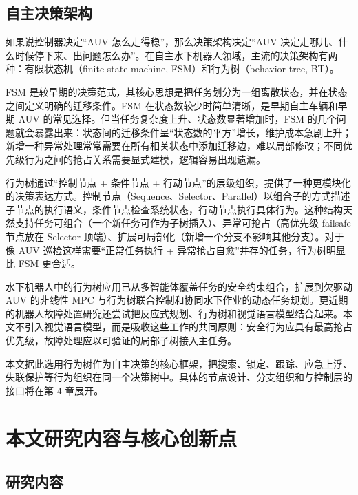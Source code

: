 \subsection{自主决策架构}\label{sec:ch01-1-3-2}

如果说控制器决定``AUV 怎么走得稳''，那么决策架构决定``AUV 决定走哪儿、什么时候停下来、出问题怎么办''。在自主水下机器人领域，主流的决策架构有两种：有限状态机（finite state machine, FSM）和行为树（behavior tree, BT）。

FSM 是较早期的决策范式，其核心思想是把任务划分为一组离散状态，并在状态之间定义明确的迁移条件。FSM 在状态数较少时简单清晰，是早期自主车辆和早期 AUV 的常见选择。但当任务复杂度上升、状态数显著增加时，FSM 的几个问题就会暴露出来：状态间的迁移条件呈``状态数的平方''增长，维护成本急剧上升；新增一种异常处理常常需要在所有相关状态中添加迁移边，难以局部修改；不同优先级行为之间的抢占关系需要显式建模，逻辑容易出现遗漏。

行为树通过``控制节点 + 条件节点 + 行动节点''的层级组织，提供了一种更模块化的决策表达方式。控制节点（Sequence、Selector、Parallel）以组合子的方式描述子节点的执行语义，条件节点检查系统状态，行动节点执行具体行为。这种结构天然支持任务可组合（一个新任务可作为子树插入）、异常可抢占（高优先级 failsafe 节点放在 Selector 顶端）、扩展可局部化（新增一个分支不影响其他分支）。对于像 AUV 巡检这样需要``正常任务执行 + 异常抢占自愈''并存的任务，行为树明显比 FSM 更合适。

水下机器人中的行为树应用已从多智能体覆盖任务的安全约束组合\cite{ozkahraman2020combining}，扩展到欠驱动 AUV 的非线性 MPC 与行为树联合控制\cite{bhat2023controlling}和协同水下作业的动态任务规划\cite{choi2025dynamic}。更近期的机器人故障处置研究还尝试把反应式规划、行为树和视觉语言模型结合起来\cite{ahmad2025unified}。本文不引入视觉语言模型，而是吸收这些工作的共同原则：安全行为应具有最高抢占优先级，故障处理应以可验证的局部子树接入主任务。

本文据此选用行为树作为自主决策的核心框架，把搜索、锁定、跟踪、应急上浮、失联保护等行为组织在同一个决策树中。具体的节点设计、分支组织和与控制层的接口将在第 4 章展开。

\section{本文研究内容与核心创新点}\label{sec:ch01-1-4}

\subsection{研究内容}\label{sec:ch01-1-4-1}

